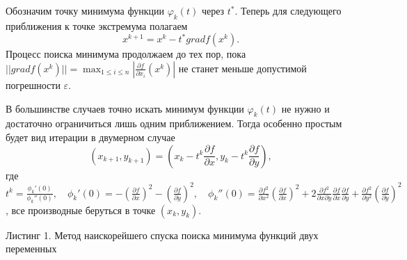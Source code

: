 \documentclass [12pt]{article}
\begin{document}
Обозначим точку минимума функции $\varphi_{k}(t)$ через $t^{*}$. Теперь для следующего приближения к точке экстремума полагаем $$ x^{k+1} = x^{k} - t^{*}gradf(x^{k}).$$
Процесс поиска минимума продолжаем до тех пор, пока $||gradf(x^{k})|| = \max_{1 \leq i \leq n} |\frac{\partial f}{\partial x_{i}}(x^{k})|$ не станет меньше допустимой погрешности $\varepsilon$.

В большинстве случаев точно искать минимум функции $\varphi_{k}(t)$ не нужно и достаточно ограничиться лишь одним приближением. Тогда особенно простым будет вид итерации в двумерном случае $$ (x_{k+1}, y_{k+1}) = (x_{k} - t^{k}\frac{\partial f}{\partial x} , y_{k} - t^{k}\frac{\partial f}{\partial y}) ,$$ где $t^{k} = \frac{\phi_{k}'(0)}{\phi_{k}''(0)}, \quad \phi_{k}'(0) = -(\frac{\partial f}{\partial x})^{2} - (\frac{\partial f}{\partial y})^{2}, \quad \phi_{k}''(0) = \frac{\partial f^{2}}{\partial x^{2}}(\frac{\partial f}{\partial x})^{2} + 2\frac{\partial f^{2}}{\partial x \partial y}\frac{\partial f}{\partial x}\frac{\partial f}{\partial y} + \frac{\partial f^{2}}{\partial y^{2}}(\frac{\partial f}{\partial y})^{2}$, все производные беруться в точке $(x_{k}, y_{k})$.

Листинг 1. Метод наискорейшего спуска поиска минимума функций двух переменных
\end{document}
